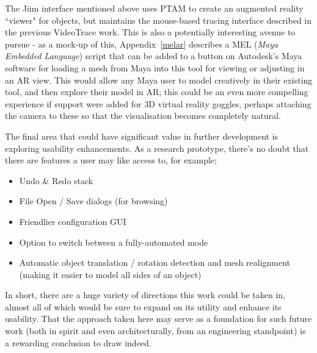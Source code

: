 \documentclass[a4paper,10pt]{report}
\begin{document}
The Jiim interface mentioned above uses PTAM to create an augmented reality ``viewer" for objects, but maintains the mouse-based tracing interface described in the previous VideoTrace work. This is also a potentially interesting avenue to pursue - as a mock-up of this, Appendix~\ref{melar} describes a MEL (\textit{Maya Embedded Language}) script that can be added to a button on Autodesk's Maya software for loading a mesh from Maya into this tool for viewing or adjusting in an AR view. This would allow any Maya user to model creatively in their existing tool, and then explore their model in AR; this could be an even more compelling experience if support were added for 3D virtual reality goggles, perhaps attaching the camera to these so that the visualisation becomes completely natural.

The final area that could have significant value in further development is exploring usability enhancements. As a research prototype, there's no doubt that there are features a user may like access to, for example;
\begin{itemize}
\item{Undo \& Redo stack}
\item{File Open / Save dialogs (for browsing)}
\item{Friendlier configuration GUI}
\item{Option to switch between a fully-automated mode}
\item{Automatic object translation / rotation detection and mesh realignment (making it easier to model all sides of an object)}
\end{itemize}

In short, there are a huge variety of directions this work could be taken in, almost all of which would be sure to expand on its utility and enhance its usability. That the approach taken here may serve as a foundation for such future work (both in spirit and even architecturally, from an engineering standpoint) is a rewarding conclusion to draw indeed.


\clearpage
\renewcommand*{\bibname}{\chapter{References}}



\clearpage
\appendix
\end{document}
